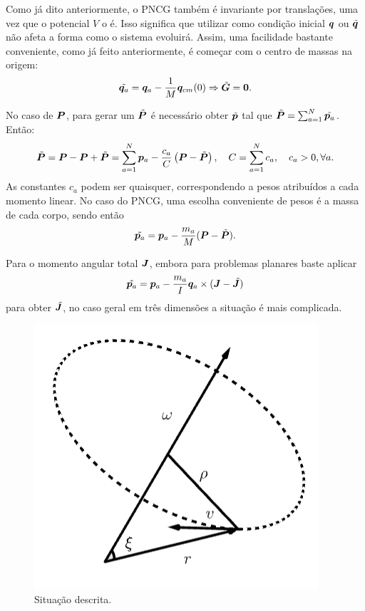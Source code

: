 Como já dito anteriormente, o PNCG também é invariante por translações, uma vez que o potencial $V$ o é. Isso significa que utilizar como condição inicial $\bm q$ ou $\tilde{\bm q}$ não afeta a forma como o sistema evoluirá. Assim, uma facilidade bastante conveniente, como já feito anteriormente, é começar com o centro de massas na origem:
\begin{equation}\label{eq:condicionamento_rcm}
    \tilde{\bm q_a} = \bm q_a - \dfrac{1}{M} \bm q_{cm}(0)
    \Rightarrow
    \tilde{\bm G} = \bm 0.
\end{equation}

No caso de $\bm P$, para gerar um $\tilde{\bm P}$ é necessário obter $\tilde{\bm p}$ tal que $\tilde{\bm P} = \sum_{a=1}^{N} \tilde{\bm p_a}$. Então:
\begin{equation*}
    \tilde{\bm P} 
    = \bm P - \bm P + \tilde{\bm P}
    = \sum_{a=1}^{N} \bm p_a - \dfrac{c_a}{C}\left(\bm P - \tilde{\bm P}\right),
    \quad
    C = \sum_{a=1}^{N} c_a,
    \quad
    c_a > 0, \forall a.
\end{equation*}
As constantes $c_a$ podem ser quaisquer, correspondendo a pesos atribuídos a cada momento linear. No caso do PNCG, uma escolha conveniente de pesos é a massa de cada corpo, sendo então
\begin{equation}\label{eq:condicionamento_p}
    \tilde{\bm p_a} = \bm p_a - \dfrac{m_a}{M} (\bm P - \tilde{\bm P}).
\end{equation}

Para o momento angular total $\bm J$, embora para problemas planares baste aplicar 
\begin{equation*}
    \tilde{\bm p_a} = \bm p_a - \dfrac{m_a}{I} \bm q_a \times (\bm J - \tilde{\bm J})
\end{equation*}
para obter $\tilde{\bm J}$, no caso geral em três dimensões a situação é mais complicada. 

\begin{figure}
    \centering
    \includegraphics[width=0.3\linewidth]{tcc//img/rotacao.png}
    \caption{Situação descrita.}
    \label{fig:angular_rotacao}
\end{figure}

